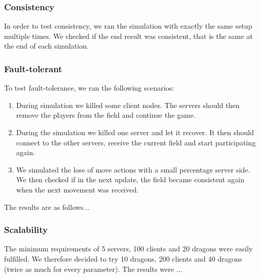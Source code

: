 	\subsubsection{Consistency}
		In order to test consistency, we ran the simulation with exactly the same setup multiple times.
		We checked if the end result was consistent, that is the same at the end of each simulation. 
		
	\subsubsection{Fault-tolerant}
		To test fault-tolerance, we ran the following scenarios:
		\begin{enumerate}
			\item During simulation we killed some client nodes. The servers should then remove the players from the field and continue the game.
			\item During the simulation we killed one server and let it recover. It then should connect to the other servers, receive the current field and start participating again.
			\item We simulated the lose of move actions with a small percentage server side. We then checked if in the next update, the field became consistent again when the next movement was received.
		\end{enumerate}
		
		The results are as follows... 
		
	\subsubsection{Scalability}
		The minimum requirements of 5 servers, 100 clients and 20 dragons were easily fulfilled. We therefore decided to try 10 dragons, 200 clients and 40 dragons (twice as much for every parameter). The results were ...
